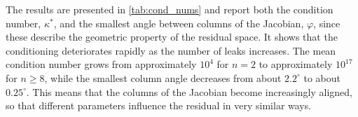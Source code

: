 \begin{algorithm}[h]
\caption{Conditioning of solutions}
\label{alg:cond_sol}
\DontPrintSemicolon
{}
\end{algorithm}

\FloatBarrier
\newpage

The results are presented in \autoref{tab:cond_nums} and report both the condition number, $\kappa^*$, and the smallest angle between columns of the Jacobian, $\varphi$, since these describe the geometric property of the residual space. It shows that the conditioning deteriorates rapidly as the number of leaks increases. The mean condition number grows from approximately $10^{4}$ for $n=2$ to approximately $10^{17}$ for $n \geq 8$, while the smallest column angle decreases from about $2.2^\circ$ to about $0.25^\circ$. This means that the columns of the Jacobian become increasingly aligned, so that different parameters influence the residual in very similar ways.\\

